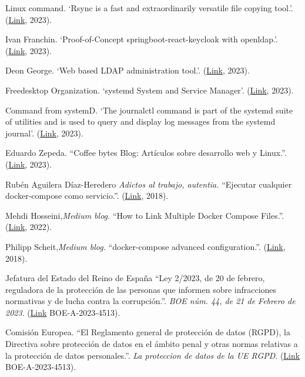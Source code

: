 \documentclass[spanish,final]{setup/eetac_tfc_pfc}
\begin{document}
\begin{thebibliography}{2}
Linux command.
`Rsync is a fast and extraordinarily versatile file copying tool.'.
(\href{https://linux.die.net/man/1/rsync}{Link}, 2023).

Ivan Franchin.
`Proof-of-Concept springboot-react-keycloak with openldap.'.
(\href{https://github.com/ivangfr/springboot-keycloak-openldap}{Link}, 2023).

Deon George.
`Web based LDAP administration tool.'.
(\href{https://github.com/leenooks/phpLDAPadmin}{Link}, 2023).

Freedesktop Organization.
`systemd System and Service Manager'.
(\href{https://www.freedesktop.org/wiki/Software/systemd/}{Link}, 2023).

Command from systemD.
`The journalctl command is part of the systemd suite of utilities and is used to query and display log messages from the systemd journal'.
(\href{https://www.geeksforgeeks.org/journalctl-command-in-linux-with-examples/}{Link}, 2023).

Eduardo Zepeda.
``Coffee bytes Blog: Artículos sobre desarrollo web y Linux.''.
(\href{https://coffeebytes.dev/container-de-docker-con-namespaces-y-cgroups/}{Link}, 2023).

 Rubén Aguilera Díaz-Heredero {\it Adictos al trabajo, autentia.}
``Ejecutar cualquier docker-compose como servicio.''.
(\href{https://www.adictosaltrabajo.com/2018/04/03/ejecutar-cualquier-docker-compose-como-servicio/}{Link}, 2018).

 Mehdi Hosseini,{\it Medium blog.}
``How to Link Multiple Docker Compose Files.''.
(\href{https://medium.com/@mehdi_hosseini/how-to-link-multiple-docker-compose-files-7250f10063a9}{Link}, 2022).

Philipp Scheit,{\it Medium blog.}
``docker-compose advanced configuration.''.
(\href{https://pscheit.medium.com/docker-compose-advanced-configuration-541356d121de}{Link}, 2018).

 Jefatura del Estado del Reino de España
``Ley 2/2023, de 20 de febrero, reguladora de la protección de las personas que informen sobre infracciones normativas y de lucha contra la corrupción.''. {\it BOE núm. 44, de 21 de Febrero de 2023}.
(\href{https://www.boe.es/eli/es/l/2023/02/20/2/con}{Link} BOE-A-2023-4513).

 Comisión Europea.
``El Reglamento general de protección de datos (RGPD), la Directiva sobre protección de datos en el ámbito penal y otras normas relativas a la protección de datos personales.''. {\it La proteccion de datos de la UE RGPD}.
(\href{https://commission.europa.eu/law/law-topic/data-protection/data-protection-eu_es}{Link} BOE-A-2023-4513).


\end{thebibliography}
\end{document}
